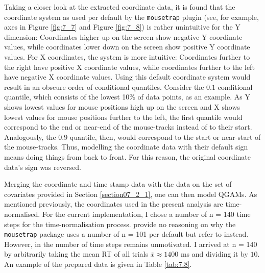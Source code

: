 Taking a closer look at the extracted coordinate data, it is found that the coordinate system as used per default by the \texttt{mousetrap} plugin (see, for example, axes in Figure \ref{fig:7_7} and Figure \ref{fig:7_8}) is rather unintuitive for the Y dimension: Coordinates higher up on the screen show negative Y coordinate values, while coordinates lower down on the screen show positive Y coordinate values. For X coordinates, the system is more intuitive: Coordinates further to the right have positive X coordinate values, while coordinates further to the left have negative X coordinate values. Using this default coordinate system would result in an obscure order of conditional quantiles. Consider the $0.1$ conditional quantile, which consists of the lowest 10\% of data points, as an example. As Y shows lowest values for mouse positions high up on the screen and X shows lowest values for mouse positions further to the left, the first quantile would correspond to the end or near-end of the mouse-tracks instead of to their start. Analogously, the $0.9$ quantile, then, would correspond to the start or near-start of the mouse-tracks. Thus, modelling the coordinate data with their default sign means doing things from back to front. For this reason, the original coordinate data’s sign was reversed.

Merging the coordinate and time stamp data with the data on the set of covariates provided in Section \ref{section07_2_1}, one can then model QGAMs. As mentioned previously, the coordinates used in the present analysis are time-normalised. For the current implementation, I chose a number of n = 140 time steps for the time-normalisation process. \citet{Kieslich2019} provide no reasoning on why the \texttt{mousetrap} package uses a number of n = 101 per default but refer to \citet{Spivey2005} instead. However, in \citet{Spivey2005} the number of time steps remains unmotivated. I arrived at n = 140 by arbitrarily taking the mean RT of all trials $\bar{x}\approx 1400$ ms and dividing it by $10$. An example of the prepared data is given in Table \ref{tab:7.8}.

